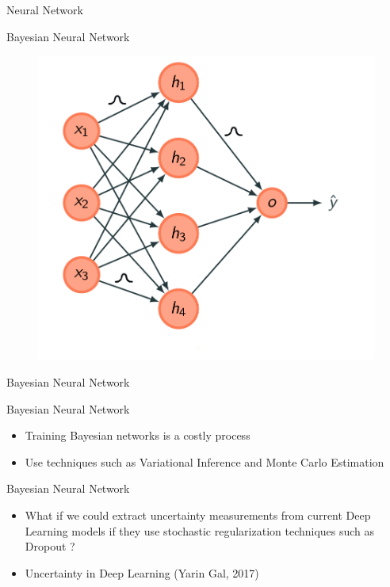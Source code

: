 \documentclass[10pt]{beamer}
\begin{document}
\begin{frame}[fragile]{Neural Network}
    
\end{frame}

\begin{frame}[fragile]{Bayesian Neural Network}
    \begin{figure}[htp]
        \centering
        \includegraphics[scale=0.3]{images/bayesian_neural_network.png}
    \end{figure}
\end{frame}

\begin{frame}[fragile]{Bayesian Neural Network}
    
\end{frame}

\begin{frame}[fragile]{Bayesian Neural Network}
\begin{itemize}
\item Training Bayesian networks is a costly process
\vspace{0.5cm}
\item Use techniques such as Variational Inference and Monte Carlo Estimation
\end{itemize}
\end{frame}

\begin{frame}[fragile]{Bayesian Neural Network}
\begin{itemize}
\item What if we could extract uncertainty measurements from current Deep
    Learning models if they use stochastic regularization techniques such as
    \alert{Dropout} ?
\vspace{0.5cm}
\item Uncertainty in Deep Learning (Yarin Gal, 2017)
\end{itemize}
\end{frame}
\end{document}
